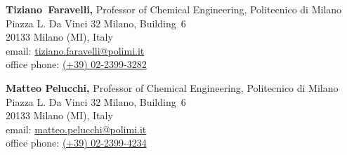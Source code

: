 \parbox{\textwidth}
{
    {\bf Tiziano~Faravelli,} Professor of Chemical Engineering, Politecnico di Milano \\
    Piazza L. Da Vinci 32 Milano, Building\ 6 \\
    20133 Milano (MI), Italy \\
    email: \href{mailto:tiziano.faravelli@polimi.it}{tiziano.faravelli@polimi.it} \\
    office phone: \href{tel:+390223993282}{(+39) 02-2399-3282}
}
\par
\parbox{\textwidth}
{
    {\bf Matteo Pelucchi,} Professor of Chemical Engineering, Politecnico di Milano \\
    Piazza L. Da Vinci 32 Milano, Building\ 6 \\
    20133 Milano (MI), Italy \\
    email: \href{mailto:matteo.pelucchi@polimi.it}{matteo.pelucchi@polimi.it} \\
    office phone: \href{tel:+390223994234}{(+39) 02-2399-4234}
}
\par
